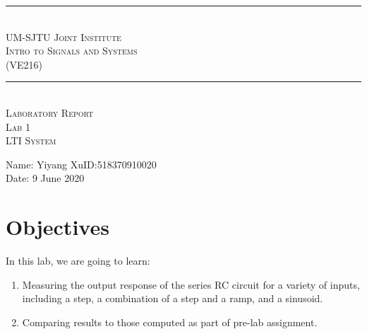 \documentclass [utf8] {article}
\begin{document}
\begin{center}
\vspace*{2cm}
\rule{14cm}{0.5pt}\\
\Large{\textsc{UM-SJTU Joint Institute\\
Intro to Signals and Systems\\
(VE216)\\}}
\rule{14cm}{0.5pt}\\
\vspace*{3cm}
\Large{\textsc{Laboratory Report\\
Lab 1\\
LTI System}}
\vspace*{3cm}
\end{center}
\large{Name: Yiyang Xu\qquad ID:518370910020\\
Date: 9 June 2020}
\newpage

\section{Objectives}
{
    In this lab, we are going to learn:
    \begin{enumerate}
        \item Measuring the output response of the series RC circuit for a variety of inputs, including a step, a combination of a step and a ramp, and a sinusoid.
        \item Comparing results to those computed as part of pre-lab assignment.
    \end{enumerate}
}
\end{document}
